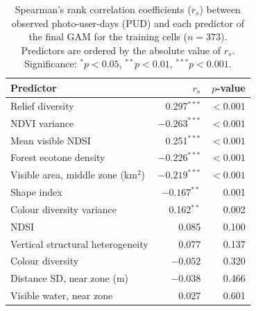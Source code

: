 \documentclass[11pt]{article}
\renewcommand{\_}{\textunderscore\allowbreak{}}
\begin{document}
\begin{table}[htbp]
\centering
\caption[Spearman correlations between observed PUD and predictors]{%
  Spearman's rank correlation coefficients ($r_s$) between observed photo-user-days
  (PUD) and each predictor of the final GAM for the training cells ($n = 373$).
  Predictors are ordered by the absolute value of $r_s$. Significance:
  $^{*}p < 0.05$, $^{**}p < 0.01$, $^{***}p < 0.001$.}
\label{tab:spearman_pud}
\begin{tabular}{@{}lrr@{}}
\toprule
\textbf{Predictor} & \textbf{$r_s$} & \textbf{$p$-value} \\
\midrule
Relief diversity                        &  0.297$^{***}$ & $<0.001$ \\
NDVI variance                           & $-0.263^{***}$ & $<0.001$ \\
Mean visible NDSI                       &  0.251$^{***}$ & $<0.001$ \\
Forest ecotone density                  & $-0.226^{***}$ & $<0.001$ \\
Visible area, middle zone (km$^2$)      & $-0.219^{***}$ & $<0.001$ \\
Shape index                             & $-0.167^{**}$  & 0.001 \\
Colour diversity variance               &  0.162$^{**}$  & 0.002 \\
NDSI                                    &  0.085         & 0.100 \\
Vertical structural heterogeneity       &  0.077         & 0.137 \\
Colour diversity                        & $-0.052$       & 0.320 \\
Distance SD, near zone (m)              & $-0.038$       & 0.466 \\
Visible water, near zone                &  0.027         & 0.601 \\
\bottomrule
\end{tabular}
\end{table}

\clearpage

\clearpage

\end{document}

